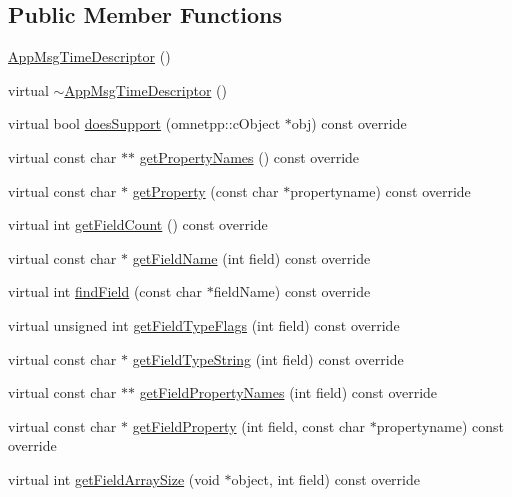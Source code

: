 \subsection*{Public Member Functions}
\begin{DoxyCompactItemize}
\item 
\hyperlink{classAppMsgTimeDescriptor_aa1c0a48d43a21f17d556759173b321b5}{App\+Msg\+Time\+Descriptor} ()
\item 
virtual \hyperlink{classAppMsgTimeDescriptor_a3ffd811d3278f9847f320937f8dc3767}{$\sim$\+App\+Msg\+Time\+Descriptor} ()
\item 
virtual bool \hyperlink{classAppMsgTimeDescriptor_a97ef37da3e4190f8e45a0ce2ee871e18}{does\+Support} (omnetpp\+::c\+Object $\ast$obj) const override
\item 
virtual const char $\ast$$\ast$ \hyperlink{classAppMsgTimeDescriptor_a88a8a3b34a9af1d9a73c6601969cc5fc}{get\+Property\+Names} () const override
\item 
virtual const char $\ast$ \hyperlink{classAppMsgTimeDescriptor_ab9f6a79300cffb71dda8372c3c4bef83}{get\+Property} (const char $\ast$propertyname) const override
\item 
virtual int \hyperlink{classAppMsgTimeDescriptor_a754ebbbce52e3b7bfe97a0aef282b3a3}{get\+Field\+Count} () const override
\item 
virtual const char $\ast$ \hyperlink{classAppMsgTimeDescriptor_ac986a70c33fc35e90bdf543c6b4d2fe4}{get\+Field\+Name} (int field) const override
\item 
virtual int \hyperlink{classAppMsgTimeDescriptor_a18f5251d319288bc3b893b1186b7777f}{find\+Field} (const char $\ast$field\+Name) const override
\item 
virtual unsigned int \hyperlink{classAppMsgTimeDescriptor_a9c4f1ee9ba789821e48b7cf0e4be6511}{get\+Field\+Type\+Flags} (int field) const override
\item 
virtual const char $\ast$ \hyperlink{classAppMsgTimeDescriptor_a576cceeffd841b561c7c8f9bb92fff85}{get\+Field\+Type\+String} (int field) const override
\item 
virtual const char $\ast$$\ast$ \hyperlink{classAppMsgTimeDescriptor_adbedb4b0c116a04c4fb28bf1d6875e79}{get\+Field\+Property\+Names} (int field) const override
\item 
virtual const char $\ast$ \hyperlink{classAppMsgTimeDescriptor_afabdeba686e7822bf682e81b6ee7009d}{get\+Field\+Property} (int field, const char $\ast$propertyname) const override
\item 
virtual int \hyperlink{classAppMsgTimeDescriptor_a57eb5d1436a72fc03d674e70cf46af7e}{get\+Field\+Array\+Size} (void $\ast$object, int field) const override

\end{DoxyCompactItemize}
